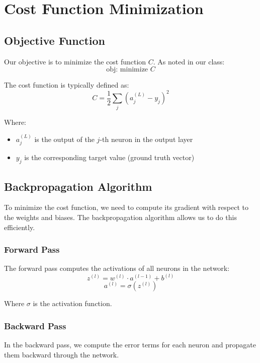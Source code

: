\section{Cost Function Minimization}

\subsection{Objective Function}
Our objective is to minimize the cost function $C$. As noted in our class:
\begin{equation}
\text{obj: minimize } C
\end{equation}

The cost function is typically defined as:
\begin{equation}
C = \frac{1}{2}\sum_j (a_j^{(L)} - y_j)^2
\end{equation}

Where:
\begin{itemize}
    \item $a_j^{(L)}$ is the output of the $j$-th neuron in the output layer
    \item $y_j$ is the corresponding target value (ground truth vector)
\end{itemize}

\subsection{Backpropagation Algorithm}
To minimize the cost function, we need to compute its gradient with respect to the weights and biases. The backpropagation algorithm allows us to do this efficiently.

\subsubsection{Forward Pass}
The forward pass computes the activations of all neurons in the network:
\begin{equation}
z^{(l)} = w^{(l)} \cdot a^{(l-1)} + b^{(l)}
\end{equation}
\begin{equation}
a^{(l)} = \sigma(z^{(l)})
\end{equation}

Where $\sigma$ is the activation function.

\subsubsection{Backward Pass}
In the backward pass, we compute the error terms for each neuron and propagate them backward through the network.

